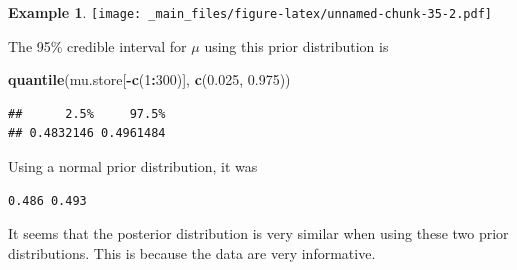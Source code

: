 \documentclass[
]{book}
\newenvironment{Shaded}{\begin{snugshade}}{\end{snugshade}}
\newcommand{\DecValTok}[1]{\textcolor[rgb]{0.00,0.00,0.81}{#1}}
\newcommand{\FloatTok}[1]{\textcolor[rgb]{0.00,0.00,0.81}{#1}}
\newcommand{\FunctionTok}[1]{\textcolor[rgb]{0.13,0.29,0.53}{\textbf{#1}}}
\newcommand{\NormalTok}[1]{#1}
\newcommand{\SpecialCharTok}[1]{\textcolor[rgb]{0.81,0.36,0.00}{\textbf{#1}}}
\theoremstyle{definition}
\theoremstyle{definition}
\newtheorem{example}{Example}[chapter]
\theoremstyle{definition}
\theoremstyle{definition}
\theoremstyle{remark}
\begin{document}
\begin{example}
\texttt{[image: \_main\_files/figure-latex/unnamed-chunk-35-2.pdf]}

The 95\% credible interval for \(\mu\) using this prior distribution is

\begin{Shaded}
\begin{Highlighting}[]
\FunctionTok{quantile}\NormalTok{(mu.store[}\SpecialCharTok{{-}}\FunctionTok{c}\NormalTok{(}\DecValTok{1}\SpecialCharTok{:}\DecValTok{300}\NormalTok{)], }\FunctionTok{c}\NormalTok{(}\FloatTok{0.025}\NormalTok{, }\FloatTok{0.975}\NormalTok{))}
\end{Highlighting}
\end{Shaded}

\begin{verbatim}
##      2.5%     97.5% 
## 0.4832146 0.4961484
\end{verbatim}

Using a normal prior distribution, it was

\begin{verbatim}
0.486 0.493
\end{verbatim}

It seems that the posterior distribution is very similar when using these two prior distributions. This is because the data are very informative.
\end{example}
\end{document}
